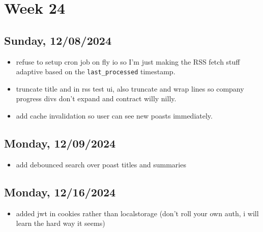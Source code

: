 \newpage
\section{Week 24}

\subsection{Sunday, 12/08/2024}
\begin{itemize}
    \item refuse to setup cron job on fly io so I'm just making the RSS fetch
        stuff adaptive based on the \texttt{last_processed} timestamp.
    \item truncate title and in rss test ui, also truncate and wrap lines so
        company progress divs don't expand and contract willy nilly.
    \item add cache invalidation so user can see new poasts immediately.
\end{itemize}

\subsection{Monday, 12/09/2024}
\begin{itemize}
    \item add debounced search over poast titles and summaries 
\end{itemize}

\subsection{Monday, 12/16/2024}
\begin{itemize}
    \item added jwt in cookies rather than localstorage (don't roll your own
        auth, i will learn the hard way it seems)
\end{itemize}
